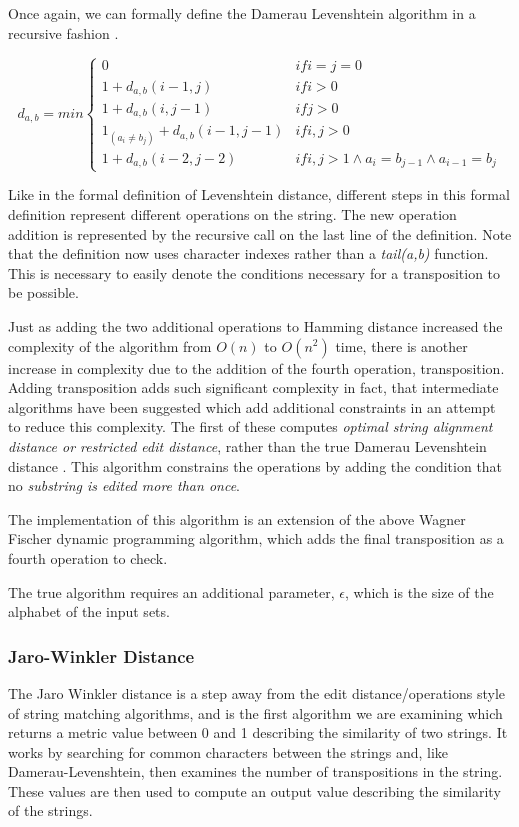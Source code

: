 \documentclass[a4paper,11pt]{article}
\begin{document}
Once again, we can formally define the Damerau Levenshtein algorithm in a recursive fashion \citep{damerauLevenshteinDefinition}.

\begin{equation}
    d_{a,b}=min\left\{\begin{matrix}
0 & if i=j=0\\ 
1+ d_{a,b}(i-1,j) & if i> 0 \\ 
1+d_{a,b}(i,j-1) & if j > 0\\ 
1_{(a_i \ne b_j)} + d_{a,b}(i-1, j-1) & if i,j > 0\\ 
1+ d_{a,b}(i-2, j-2) & if i,j > 1 \land a_i = b_{j-1} \land a_{i-1}=b_j 
\end{matrix}\right.
\end{equation}

Like in the formal definition of Levenshtein distance, different steps in this formal definition represent different operations on the string. The new operation addition is represented by the recursive call on the last line of the definition. Note that the definition now uses character indexes rather than a \textit{tail(a,b)} function. This is necessary to easily denote the conditions necessary for a transposition to be possible.

Just as adding the two additional operations to Hamming distance increased the complexity of the algorithm from $O(n)$ to $O(n^2)$ time, there is another increase in complexity due to the addition of the fourth operation, transposition. Adding transposition adds such significant complexity in fact, that intermediate algorithms have been suggested which add additional constraints in an attempt to reduce this complexity. The first of these computes \textit{optimal string alignment distance or restricted edit distance}, rather than the true Damerau Levenshtein distance \citep{damerauLevenshteinDefinition}. This algorithm constrains the operations by adding the condition that no  \textit{substring is edited more than once}.

The implementation of this algorithm is an extension of the above Wagner Fischer dynamic programming algorithm, which adds the final transposition as a fourth operation to check.

The true algorithm requires an additional parameter, $\epsilon$, which is the size of the alphabet of the input sets.


\subsubsection{Jaro-Winkler Distance}
The Jaro Winkler distance is a step away from the edit distance/operations style of string matching algorithms, and is the first algorithm we are examining which returns a metric value between 0 and 1 describing the similarity of two strings. It works by searching for common characters between the strings and, like Damerau-Levenshtein, then examines the number of transpositions in the string. These values are then used to compute an output value describing the similarity of the strings.
\end{document}
